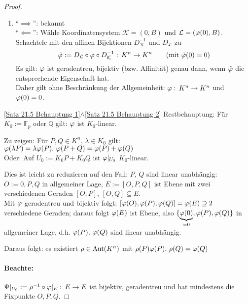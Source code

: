 \documentclass[parskip,a4paper,twoside,DIV15,BCOR12mm]{scrbook}
\begin{document}
\begin{proof}
\begin{enumerate}
\item ``\(\implies\)'': bekannt \checkmark\\
``\(\impliedby\)'': Wähle Koordinatensystem \(\mathcal{K}=(0,B)\) und
\(\mathcal{L}=(\varphi(0),B)\).\\
Schachtele mit den affinen Bijektionen \(D_{\mathcal{K}}^{-1}\) und
\(D_{\mathcal{L}}\) zu
\[
\tilde{\varphi}:=D_{\mathcal{L}}\circ\varphi\circ D_{\mathcal{K}}^{-1}:\,K^{n}\to K^{n}
    \qquad(\text{mit }\tilde{\varphi}(0)=0)
\]
Es gilt: \(\varphi\) ist geradentreu, bijektiv (bzw. Affinität) genau dann, wenn
\(\tilde{\varphi}\) die entsprechende Eigenschaft hat.\\
Daher gilt ohne Beschränkung der Allgemeinheit: \(\varphi:\,K^{n}\to K^{n}\) und
\(\varphi(0)=0\).
\end{enumerate}
\eqref{Satz 21.5 Behauptung 1}\(\wedge\)\eqref{Satz 21.5 Behauptung 2} 
    Restbehauptung: Für \(K_{0}:=\mathbb{F}_{p}\) oder \(\mathbb{Q}\) gilt:
\(\varphi\) ist \(K_{0}\)-linear.

Zu zeigen: Für \(P,Q\in K^{n},\,\lambda\in K_{0}\) gilt:
    \(\varphi(\lambda P)=\lambda\varphi(P),\,\varphi(P+Q)=\varphi(P)+\varphi(Q)\)\\
Oder: Auf \(U_{0}:=K_{0}P+K_{0}Q\) ist \(\varphi|_{U_{0}}\) \(K_{0}\)-linear.

Dies ist leicht zu reduzieren auf den Fall: \(P,\,Q\) sind linear unabhängig:
\break
\(O:=0,P,Q\) in allgemeiner Lage, \(E:=[O,P,Q]\) ist Ebene mit zwei 
verschiedenen Geraden \([O,P],\,[O,Q]\subseteq E\).\\
Mit \(\varphi\) geradentreu und bijektiv folgt: 
\([\varphi(O),\varphi(P),\varphi(Q)]=\varphi(E)\supseteq2\) verschiedene Geraden; daraus folgt
\(\varphi(E)\) ist Ebene, also \(\{\underbrace{\varphi(0)}_{=0},\varphi(P),\varphi(Q)\}\) in
allgemeiner Lage, d.h. \(\varphi(P),\,\varphi(Q)\) sind linear unabhängig.

Daraus folgt: es existiert \(\rho\in\operatorname{Aut}(K^{n})\) mit 
\(\rho(P)\varphi(P),\,\rho(Q)=\varphi(Q)\)
\paragraph{Beachte:}{\(\Psi|_{U_{0}}:=\rho^{-1}\circ\varphi|_{E}:\,E\to E\) ist
bijektiv, geradentreu und hat mindestens die Fixpunkte \(O,P,Q\).}

\end{proof}
\end{document}
